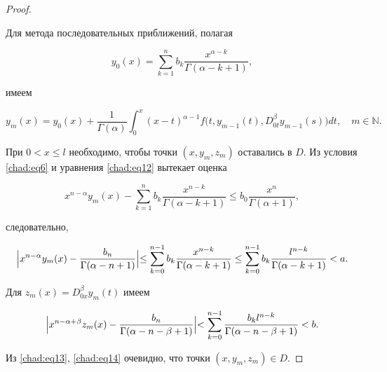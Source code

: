 \begin{proof}
\begin{equation}
\end{equation}



Для метода последовательных приближений,  полагая

\begin{equation*}


y_0(x)=\sum_{k=1}^n b_k\frac{x^{\alpha-k}}{\Gamma(\alpha-k+1)} , 

\end{equation*}

имеем

\begin{equation}

\label{chad:eq12}

y_m(x)=y_0(x)+\frac{1}{\Gamma(\alpha)}\int_0^x(x-t)^{\alpha-1}f\bigl(t, y_{m-1}(t), D_{0t}^\beta y_{m-1}(s)\bigr)dt, \quad m\in \mathbb N.

\end{equation}

При $0<x\leq l$ необходимо,  чтобы точки $(x, y_m, z_m)$ оставались в $D$. Из условия \eqref{chad:eq6} и уравнения \eqref{chad:eq12} вытекает оценка

$$

x^{n-\alpha}y_m(x)-\sum_{k=1}^n b_k\frac{x^{n-k}}{\Gamma(\alpha-k+1)}\leq b_0\frac{x^n}{\Gamma(\alpha+1)},

$$

следовательно,

\begin{equation}

\label{chad:eq13}

\Bigl|x^{n-\alpha}y_m(x)-\frac{b_n}{\Gamma(\alpha-n+1)}\Bigl|\leq\sum_{k=0}^{n-1} b_k\frac{x^{n-k}}{\Gamma(\alpha-k+1)}\leq \sum_{k=0}^{n-1}b_k\frac{l^{n-k}}{\Gamma(\alpha-k+1)}<a.

\end{equation}

Для $z_m(x)=D_{0x}^\beta y_m(t)$ имеем

\begin{equation}

\label{chad:eq14}

\Bigl|x^{n-\alpha+\beta}z_m(x)-\frac{b_n}{\Gamma(\alpha-n-\beta+1)}\Bigl|<\sum_{k=0}^{n-1} \frac{b_kl^{n-k}}{\Gamma(\alpha-n-\beta+1)}<b.

\end{equation}



Из \eqref{chad:eq13}, \eqref{chad:eq14} очевидно,  что точки $(x, y_m, z_m)\in D$. 


\end{proof}
